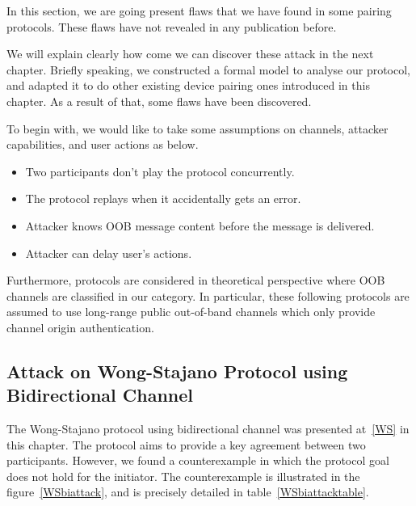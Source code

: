 \begin{enumerate}
\begin{enumerate}
In this section, we are going present flaws that we have found in some pairing protocols. These flaws have not revealed in any publication before. 

We will explain clearly how come we can discover these attack in the next chapter. Briefly speaking, we constructed a formal model to analyse our protocol, and adapted it to do other existing device pairing ones introduced in this chapter. As a result of that, some flaws have been discovered. 

To begin with, we would like to take some assumptions on channels, attacker capabilities, and user actions as below. 
\begin{itemize}
\item Two participants don't play the protocol concurrently.
\item The protocol replays when it accidentally gets an error. 
\item Attacker knows OOB message content before the message is delivered.
\item Attacker can delay user's actions. 
\end{itemize}

Furthermore, protocols are considered in theoretical perspective where OOB channels are classified in our category. In particular, these following protocols are assumed to use long-range public out-of-band channels which only provide channel origin authentication.  

\subsection{Attack on Wong-Stajano Protocol using Bidirectional Channel}

The Wong-Stajano protocol using bidirectional channel was presented at~\ref{WS} in this chapter. The protocol aims to provide a key agreement between two participants. However, we found a counterexample in which the protocol goal does not hold for the initiator. The counterexample is illustrated in the figure~\ref{WSbiattack}, and is precisely detailed in table~\ref{WSbiattacktable}. 


\end{enumerate}
\end{enumerate}
